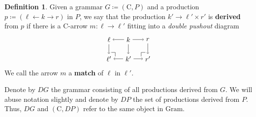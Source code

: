 \documentclass{amsart}
\newcommand{\C}{\cat{C}}
\newcommand{\Gram}{\cat{Gram}}
\newcommand{\defn}[1]{\textbf{#1}}
\newcommand{\cat}[1]{\mathrm{#1}}
\newcommand{\from}{\colon}
\newcommand{\spn}[3]{#2 \to #1 \times #3}
\theoremstyle{remark}
\theoremstyle{definition}
\newtheorem{definition}[theorem]{Definition}
\begin{document}
\begin{definition}

  Given a grammar $ G \coloneqq ( \C , P ) $ and a production
  $ p \coloneqq ( \ell \gets k \to r ) $ in $ P $, we say that the
  production $ \spn{\ell'}{k'}{r'} $ is \defn{derived} from $ p $ if
  there is a $ \C $-arrow $ m \from \ell \to \ell' $ fitting into a
  \emph{double pushout} diagram %
  \[
    \begin{tikzpicture}
      \node (1) at (0,1) {\( \ell \)};
      \node (2) at (1,1) {\( k \)};
      \node (3) at (2,1) {\( r \)};
      \node (4) at (0,0) {\( \ell' \)};
      \node (5) at (1,0) {\( k' \)};
      \node (6) at (2,0) {\( r' \)};
      \draw [->] (2) to node [] {\scriptsize{\( \)}} (1);
      \draw [->] (2) to node [] {\scriptsize{\( \)}} (3);
      \draw [->] (5) to node [] {\scriptsize{\( \)}} (4);
      \draw [->] (5) to node [] {\scriptsize{\( \)}} (6);
      \draw [->] (1) to node [] {\scriptsize{\( \)}} (4);
      \draw [->] (2) to node [] {\scriptsize{\( \)}} (5);
      \draw [->] (3) to node [] {\scriptsize{\( \)}} (6);
      \node (a) at (0,0.33) {};
      \node (b) at (0.33,0.33) {};
      \node (c) at (0.33,0) {};
      \node (d) at (1.66,0) {};
      \node (e) at (1.66,0.33) {};
      \node (f) at (2,0.33) {};
      \draw (a) -- (b.center);
      \draw (b.center) -- (c);
      \draw (d) -- (e.center);
      \draw (e.center) -- (f);
    \end{tikzpicture}
  \]
  We call the arrow $ m $ a \defn{match} of $ \ell $ in $ \ell' $.
  
  Denote by $ DG $ the grammar consisting of all productions derived
  from $ G $. We will abuse notation slightly and denote by $ DP $ the
  set of productions derived from $ P $. Thus, $ DG $ and $ ( \C , DP
  ) $ refer to the same object in $ \Gram $.
  
\end{definition}
\end{document}
